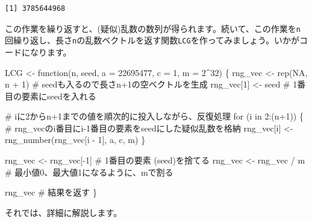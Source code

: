 \documentclass[
  a4paper,
  pandoc,
  ja=standard,
  jafont=haranoaji]{bxjsbook}
\newenvironment{Shaded}{\begin{snugshade}}{\end{snugshade}}
\newcommand{\AttributeTok}[1]{\textcolor[rgb]{0.00,0.48,0.65}{#1}}
\newcommand{\CommentTok}[1]{\textcolor[rgb]{0.37,0.37,0.37}{#1}}
\newcommand{\ConstantTok}[1]{\textcolor[rgb]{0.56,0.35,0.01}{#1}}
\newcommand{\ControlFlowTok}[1]{\textcolor[rgb]{0.00,0.48,0.65}{#1}}
\newcommand{\DecValTok}[1]{\textcolor[rgb]{0.68,0.00,0.00}{#1}}
\newcommand{\FunctionTok}[1]{\textcolor[rgb]{0.28,0.35,0.67}{#1}}
\newcommand{\NormalTok}[1]{\textcolor[rgb]{0.00,0.48,0.65}{#1}}
\newcommand{\OtherTok}[1]{\textcolor[rgb]{0.00,0.48,0.65}{#1}}
\newcommand{\SpecialCharTok}[1]{\textcolor[rgb]{0.37,0.37,0.37}{#1}}
\begin{document}
\begin{verbatim}
[1] 3785644968
\end{verbatim}

この作業を繰り返すと、(疑似)乱数の数列が得られます。続いて、この作業を\texttt{n}回繰り返し、長さ\texttt{n}の乱数ベクトルを返す関数\texttt{LCG}を作ってみましょう。いかがコードになります。

\begin{Shaded}
\begin{Highlighting}[numbers=left,,]
\NormalTok{LCG }\OtherTok{\textless{}{-}} \ControlFlowTok{function}\NormalTok{(n, seed, }\AttributeTok{a =} \DecValTok{22695477}\NormalTok{, }\AttributeTok{c =} \DecValTok{1}\NormalTok{, }\AttributeTok{m =} \DecValTok{2}\SpecialCharTok{\^{}}\DecValTok{32}\NormalTok{) \{}
\NormalTok{  rng\_vec    }\OtherTok{\textless{}{-}} \FunctionTok{rep}\NormalTok{(}\ConstantTok{NA}\NormalTok{, n }\SpecialCharTok{+} \DecValTok{1}\NormalTok{) }\CommentTok{\# seedも入るので長さn+1の空ベクトルを生成}
\NormalTok{  rng\_vec[}\DecValTok{1}\NormalTok{] }\OtherTok{\textless{}{-}}\NormalTok{ seed           }\CommentTok{\# 1番目の要素にseedを入れる}
  
  \CommentTok{\# iに2からn+1までの値を順次的に投入しながら、反復処理}
  \ControlFlowTok{for}\NormalTok{ (i }\ControlFlowTok{in} \DecValTok{2}\SpecialCharTok{:}\NormalTok{(n}\SpecialCharTok{+}\DecValTok{1}\NormalTok{)) \{}
    \CommentTok{\# rng\_vecのi番目にi{-}1番目の要素をseedにした疑似乱数を格納}
\NormalTok{    rng\_vec[i] }\OtherTok{\textless{}{-}} \FunctionTok{rng\_number}\NormalTok{(rng\_vec[i }\SpecialCharTok{{-}} \DecValTok{1}\NormalTok{], a, c, m)}
\NormalTok{  \}}
  
\NormalTok{  rng\_vec }\OtherTok{\textless{}{-}}\NormalTok{ rng\_vec[}\SpecialCharTok{{-}}\DecValTok{1}\NormalTok{] }\CommentTok{\# 1番目の要素 (seed)を捨てる}
\NormalTok{  rng\_vec }\OtherTok{\textless{}{-}}\NormalTok{ rng\_vec }\SpecialCharTok{/}\NormalTok{ m }\CommentTok{\# 最小値0、最大値1になるように、mで割る}
  
\NormalTok{  rng\_vec }\CommentTok{\# 結果を返す}
\NormalTok{\}}
\end{Highlighting}
\end{Shaded}

それでは、詳細に解説します。
\end{document}

